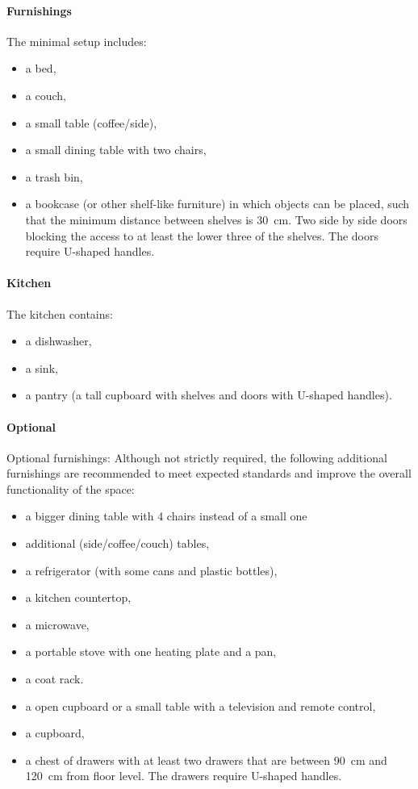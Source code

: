 \paragraph{Furnishings} The minimal setup includes:
\begin{itemize}
    \item a bed,
    \item a couch,
    \item a small table (coffee/side),
    \item a small dining table with two chairs,
    \item a trash bin,
    \item a bookcase (or other shelf-like furniture) in which objects can be placed, such that the minimum distance between shelves is \qty{30}{\centi\meter}. Two side by side doors blocking the access to at least the lower three of the shelves. The doors require U-shaped handles.
\end{itemize}

\paragraph{Kitchen} The kitchen contains:
\begin{itemize}
    \item a dishwasher,
    \item a sink,
    \item a pantry (a tall cupboard with shelves and doors with U-shaped handles).
\end{itemize}

\paragraph{Optional} Optional furnishings:
Although not strictly required, the following additional furnishings are recommended to meet expected standards and improve the overall functionality of the space:
\begin{itemize}
    \item a bigger dining table with 4 chairs instead of a small one
    \item additional (side/coffee/couch) tables,
    \item a refrigerator (with some cans and plastic bottles), 
    \item a kitchen countertop,
    \item a microwave,
    \item a portable stove with one heating plate and a pan,
    \item a coat rack.
    \item a open cupboard or a small table with a television and remote control,
    \item a cupboard,
    \item a chest of drawers with at least two drawers that are between \qty{90}{\centi\meter} and \qty{120}{\centi\meter} from floor level. The drawers require U-shaped handles.
\end{itemize}

